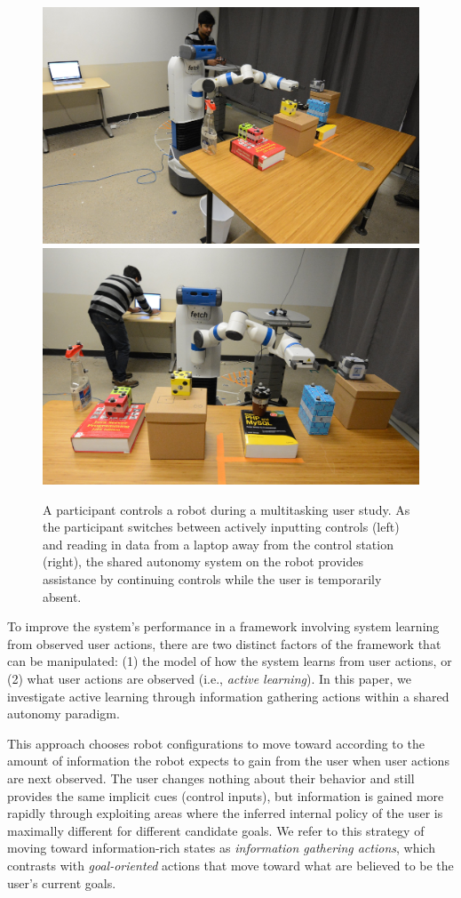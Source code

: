 \documentclass[conference]{IEEEtran}
\begin{document}
\begin{figure}
\includegraphics[width=0.49\columnwidth]{figures/task_setup-v3.jpg}
\includegraphics[width=0.49\columnwidth]{figures/teaser-v2.jpg}
\caption{A participant controls a robot during a multitasking user study. As the participant switches between actively inputting controls (left) and reading in data from a laptop away from the control station (right), the shared autonomy system on the robot provides assistance by continuing controls while the user is temporarily absent.}
\label{teaser}
\end{figure}

To improve the system's performance in a framework involving system learning from observed user actions, there are two distinct factors of the framework that can be manipulated: (1) the model of how the system learns from user actions, or (2) what user actions are observed (i.e., \textit{active learning}). In this paper, we investigate active learning through information gathering actions within a shared autonomy paradigm.

This approach chooses robot configurations to move toward according to the amount of information the robot expects to gain from the user when user actions are next observed. The user changes nothing about their behavior and still provides the same implicit cues (control inputs), but information is gained more rapidly through exploiting areas where the inferred internal policy of the user is maximally different for different candidate goals. We refer to this strategy of moving toward information-rich states as \textit{information gathering actions}, which contrasts with \textit{goal-oriented} actions that move toward what are believed to be the user's current goals.
\end{document}
